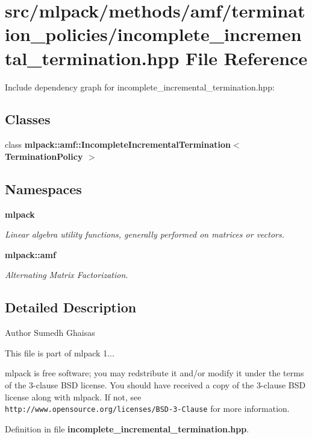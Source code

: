 \section{src/mlpack/methods/amf/termination\-\_\-policies/incomplete\-\_\-incremental\-\_\-termination.hpp File Reference}
\label{incomplete__incremental__termination_8hpp}
Include dependency graph for incomplete\-\_\-incremental\-\_\-termination.\-hpp\-:
\subsection*{Classes}
\begin{DoxyCompactItemize}
\item 
class {\bf mlpack\-::amf\-::\-Incomplete\-Incremental\-Termination$<$ Termination\-Policy $>$}
\end{DoxyCompactItemize}
\subsection*{Namespaces}
\begin{DoxyCompactItemize}
\item 
{\bf mlpack}
\begin{DoxyCompactList}\small\item\em Linear algebra utility functions, generally performed on matrices or vectors. \end{DoxyCompactList}\item 
{\bf mlpack\-::amf}
\begin{DoxyCompactList}\small\item\em Alternating Matrix Factorization. \end{DoxyCompactList}\end{DoxyCompactItemize}


\subsection{Detailed Description}
\begin{DoxyAuthor}{Author}
Sumedh Ghaisas
\end{DoxyAuthor}
This file is part of mlpack 1...

mlpack is free software; you may redstribute it and/or modify it under the terms of the 3-\/clause B\-S\-D license. You should have received a copy of the 3-\/clause B\-S\-D license along with mlpack. If not, see {\tt http\-://www.\-opensource.\-org/licenses/\-B\-S\-D-\/3-\/\-Clause} for more information. 

Definition in file {\bf incomplete\-\_\-incremental\-\_\-termination.\-hpp}.

